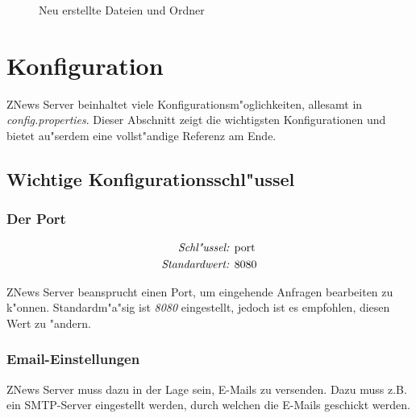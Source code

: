 \begin{figure}[htb]
    \caption{\label{fig:dirtree2}Neu erstellte Dateien und Ordner}
\end{figure}

\pagebreak
\section{Konfiguration}%
\label{sec:config}

ZNews Server beinhaltet viele Konfigurationsm"oglichkeiten,
allesamt in \emph{config.properties}.
Dieser Abschnitt zeigt die wichtigsten Konfigurationen
und bietet au"serdem eine vollst"andige Referenz am Ende.

\subsection{Wichtige Konfigurationsschl"ussel}

\subsubsection{Der Port} \label{sec:config:port}

\begin{align*}
    \emph{Schl"ussel: } & \lstinline{port}\\
    \emph{Standardwert: } & \lstinline{8080}
\end{align*}

ZNews Server beansprucht einen Port, um eingehende
Anfragen bearbeiten zu k"onnen. Standardm"a"sig ist
\emph{8080} eingestellt, jedoch ist es empfohlen,
diesen Wert zu "andern.

\subsubsection{Email-Einstellungen}

ZNews Server muss dazu in der Lage sein, E-Mails
zu versenden. Dazu muss z.B. ein SMTP-Server eingestellt
werden, durch welchen die E-Mails geschickt werden.


